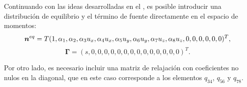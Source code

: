 Continuando con las ideas desarrolladas en el , es posible introducir una distribuci\'on de equilibrio y el t\'ermino de fuente directamente en el espacio de momentos:
\begin{equation}
	\bm{n}^{eq} = T ( 1, \alpha_1, \alpha_2, \alpha_3u_x, \alpha_4u_x, \alpha_5u_y, \alpha_6u_y, \alpha_7u_z, \alpha_8u_z,0,0,0,0,0,0)^T,
\end{equation}
\begin{equation}
	\bm{\Gamma} = (s,0,0,0,0,0,0,0,0,0,0,0,0,0,0)^T.	
\end{equation}

Por otro lado, es necesario incluir una matriz de relajaci\'on con coeficientes no nulos en la diagonal, que en este caso corresponde a los elementos $q_{34}$, $q_{56}$ y $q_{78}$.

